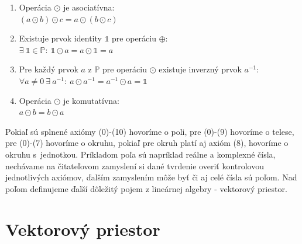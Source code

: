 \documentclass[a4paper, 10pt, ]{article}
\begin{document}
\begin{definition}
\begin{enumerate}
        \item Operácia $\odot$ je asociatívna: \\
        \tab\tab $(a \odot b) \odot c = a \odot (b \odot c)$

        \item Existuje prvok identity $\mathbb{1}$ pre operáciu $\oplus$: \\
        \tab\tab $\exists \ \mathbb{1} \in \mathbb{P}: \ \mathbb{1} \odot a = a \odot \mathbb{1} = a$

        \item Pre každý prvok $a$ z $\mathbb{P}$ pre operáciu $\odot$ existuje inverzný prvok $a^{-1}$: \\
        \tab\tab $\forall a \neq 0 \ \exists \ a^{-1}: \ a \odot a^{-1} = a^{-1} \odot a = \mathbb{1}$

        \item Operácia $\odot$ je komutatívna: \\
        \tab\tab $a \odot b = b \odot a$
    \end{enumerate}
\end{definition}

Pokiaľ sú splnené axiómy (0)-(10) hovoríme o poli, pre (0)-(9) hovoríme o telese, pre (0)-(7) hovoríme o okruhu, pokiaľ pre okruh platí aj axióm (8), hovoríme o okruhu s~jednotkou. Príkladom poľa sú napríklad reálne a komplexné čísla, nechávame na čitateľovom zamyslení si dané tvrdenie overiť kontrolovou jednotlivých axiómov, ďalším zamyslením môže byť či aj celé čísla sú poľom. Nad poľom definujeme ďalší dôležitý pojem z lineárnej algebry - vektorový priestor.



\section{Vektorový priestor}
\label{VectorSpace}
\end{document}
